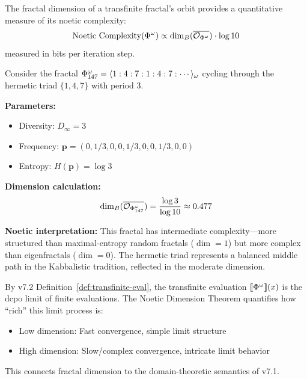 \begin{corollary}
\label{cor:dimension-complexity}
The fractal dimension of a transfinite fractal's orbit provides a quantitative measure of its noetic complexity:
\[
\text{Noetic Complexity}(\Phi^{\omega}) \propto \dim_B(\overline{\mathcal{O}_{\Phi^{\omega}}}) \cdot \log 10
\]
measured in bits per iteration step.
\end{corollary}

\begin{example}
\label{ex:noetic-dim-application}
Consider the fractal $\Phi^{\omega}_{147} = \langle 1 : 4 : 7 : 1 : 4 : 7 : \cdots \rangle_\omega$ cycling through the hermetic triad $\{1, 4, 7\}$ with period 3.

\textbf{Parameters:}
\begin{itemize}
  \item Diversity: $D_\infty = 3$
  \item Frequency: $\mathbf{p} = (0, 1/3, 0, 0, 1/3, 0, 0, 1/3, 0, 0)$
  \item Entropy: $H(\mathbf{p}) = \log 3$
\end{itemize}

\textbf{Dimension calculation:}
\[
\dim_B(\overline{\mathcal{O}_{\Phi^{\omega}_{147}}}) = \frac{\log 3}{\log 10} \approx 0.477
\]

\textbf{Noetic interpretation:} This fractal has intermediate complexity---more structured than maximal-entropy random fractals ($\dim = 1$) but more complex than eigenfractals ($\dim = 0$). The hermetic triad represents a balanced middle path in the Kabbalistic tradition, reflected in the moderate dimension.
\end{example}

\begin{remark}
\label{rem:transfinite-eval-dim}
By v7.2 Definition~\ref*{def:transfinite-eval}, the transfinite evaluation $\llbracket \Phi^{\omega} \rrbracket(x)$ is the dcpo limit of finite evaluations. The Noetic Dimension Theorem quantifies how ``rich'' this limit process is:
\begin{itemize}
  \item Low dimension: Fast convergence, simple limit structure
  \item High dimension: Slow/complex convergence, intricate limit behavior
\end{itemize}
This connects fractal dimension to the domain-theoretic semantics of v7.1.
\end{remark}

